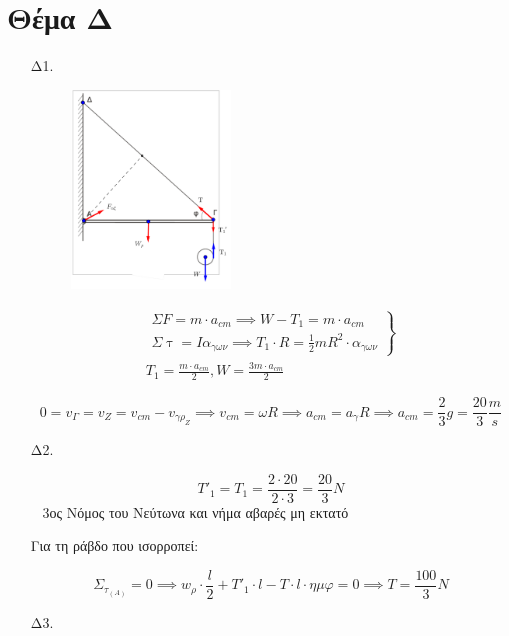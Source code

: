 \documentclass[12pt]{article}
\begin{document}
  \section*{Θέμα Δ}

  \begin{enumerate}
    \item [Δ1.]

    \begin{figure}[h]
      \includegraphics[width=0.4\textwidth]{ΦυσικήΔ1.png}
      \centering
    \end{figure}

    \begin{gather*}
      \left. \begin{matrix}ΣF=m\cdot a_{cm}\implies W-T_1=m\cdot a_{cm} \\ Σ\uptau=Iα_{γων}\implies T_1\cdot R=\frac{1}{2}mR^2\cdot α_{γων}\end{matrix} \right\} \\
      T_1=\frac{m\cdot a_{cm}}{2},W=\frac{3m\cdot a_{cm}}{2}
    \end{gather*}

    $$0=v_Γ=v_Z=v_{cm}-v_{γρ_Ζ}\implies v_{cm}=ωR\implies a_{cm}=a_γ R\implies a_{cm}=\frac{2}{3}g=\frac{20}{3}\frac{m}{s}$$

    \item [Δ2.]

    $$T'_1=T_1=\frac{2\cdot 20}{2\cdot 3}=\frac{20}{3}N$$
  
    3ος Νόμος του Νεύτωνα και νήμα αβαρές μη εκτατό

    Για τη ράβδο που ισορροπεί:

    $$Σ_{τ_{(Α)}}=0\implies w_ρ\cdot\frac{l}{2}+T'_1\cdot l-T\cdot l\cdot ημφ=0\implies T=\frac{100}{3}N$$

    \item [Δ3.]



\end{enumerate}
\end{document}
